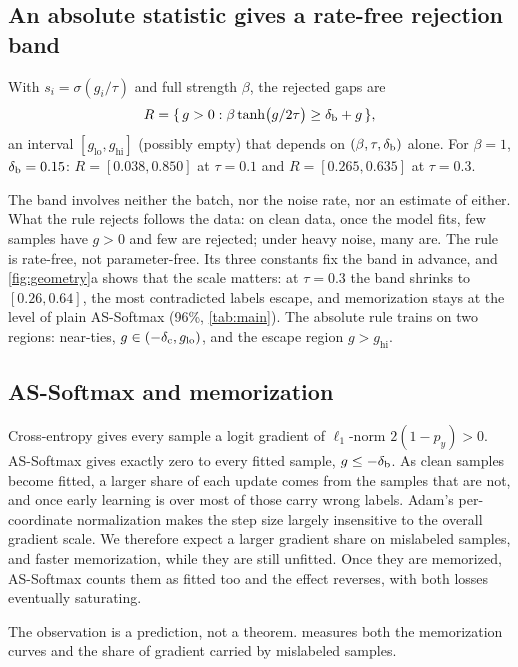 \subsection{An absolute statistic gives a rate-free rejection band}

\begin{corollary}
\label{cor:band}
With $s_i = \sigma(g_i / \tau)$ and full strength $\beta$, the rejected gaps are
\[
  R = \{\, g > 0 : \beta \tanh\!\big(g / 2\tau\big) \ge \delta_{\mathrm{b}} + g \,\},
\]
an interval $[g_{\mathrm{lo}}, g_{\mathrm{hi}}]$ (possibly empty) that depends on
$(\beta, \tau, \delta_{\mathrm{b}})$ alone. For $\beta = 1$, $\delta_{\mathrm{b}} = 0.15$:
$R = [0.038, 0.850]$ at $\tau = 0.1$ and $R = [0.265, 0.635]$ at $\tau = 0.3$.
\end{corollary}

The band involves neither the batch, nor the noise rate, nor an estimate of either. What the rule
rejects follows the data: on clean data, once the model fits, few samples have $g > 0$ and few are
rejected; under heavy noise, many are. The rule is rate-free, not parameter-free. Its three
constants fix the band in advance, and \cref{fig:geometry}a shows that the scale matters: at
$\tau = 0.3$ the band shrinks to $[0.26, 0.64]$, the most contradicted labels escape, and
memorization stays at the level of plain AS-Softmax (96\%, \cref{tab:main}). The absolute rule
trains on two regions: near-ties, $g \in (-\delta_{\mathrm{c}}, g_{\mathrm{lo}})$, and the escape region
$g > g_{\mathrm{hi}}$.

\subsection{AS-Softmax and memorization}

\begin{observation}
\label{obs:as}
Cross-entropy gives every sample a logit gradient of $\ell_1$-norm $2(1 - p_y) > 0$. AS-Softmax
gives exactly zero to every fitted sample, $g \le -\delta_{\mathrm{b}}$. As clean samples become fitted, a larger
share of each update comes from the samples that are not, and once early learning is over most of
those carry wrong labels. Adam's per-coordinate normalization \citep{kingma2015adam,loshchilov2019adamw} makes
the step size largely insensitive to the overall gradient scale. We therefore expect a larger
gradient share on mislabeled samples, and faster memorization, while they are still unfitted.
Once they are memorized, AS-Softmax counts them as fitted too and the effect reverses, with both
losses eventually saturating.
\end{observation}

The observation is a prediction, not a theorem.  measures both the
memorization curves and the share of gradient carried by mislabeled samples.
